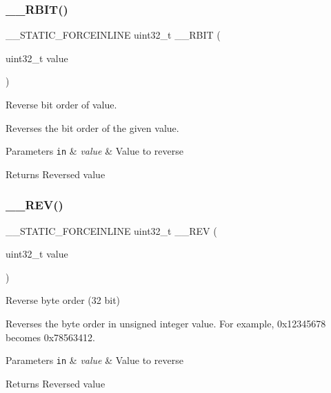 \subsubsection{\texorpdfstring{\+\_\+\+\_\+\+R\+B\+I\+T()}{\_\_RBIT()}}
{\footnotesize\ttfamily \+\_\+\+\_\+\+S\+T\+A\+T\+I\+C\+\_\+\+F\+O\+R\+C\+E\+I\+N\+L\+I\+NE uint32\+\_\+t \+\_\+\+\_\+\+R\+B\+IT (\begin{DoxyParamCaption}\item[{uint32\+\_\+t}]{value }\end{DoxyParamCaption})}



Reverse bit order of value. 

Reverses the bit order of the given value. 
\begin{DoxyParams}[1]{Parameters}
\mbox{\tt in}  & {\em value} & Value to reverse \\
\hline
\end{DoxyParams}
\begin{DoxyReturn}{Returns}
Reversed value 
\end{DoxyReturn}
\mbox{\label{group___c_m_s_i_s___core___instruction_interface_gadb92679719950635fba8b1b954072695}} 
\subsubsection{\texorpdfstring{\+\_\+\+\_\+\+R\+E\+V()}{\_\_REV()}}
{\footnotesize\ttfamily \+\_\+\+\_\+\+S\+T\+A\+T\+I\+C\+\_\+\+F\+O\+R\+C\+E\+I\+N\+L\+I\+NE uint32\+\_\+t \+\_\+\+\_\+\+R\+EV (\begin{DoxyParamCaption}\item[{uint32\+\_\+t}]{value }\end{DoxyParamCaption})}



Reverse byte order (32 bit) 

Reverses the byte order in unsigned integer value. For example, 0x12345678 becomes 0x78563412. 
\begin{DoxyParams}[1]{Parameters}
\mbox{\tt in}  & {\em value} & Value to reverse \\
\hline
\end{DoxyParams}
\begin{DoxyReturn}{Returns}
Reversed value 
\end{DoxyReturn}
\mbox{\label{group___c_m_s_i_s___core___instruction_interface_gaa12aedd096506c9639c1581acd5c6a78}} 

